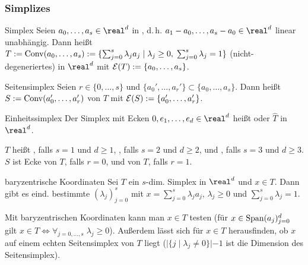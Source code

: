 \pagebreak

\subsubsection{%
    Simplizes%
}

\begin{Def}{Simplex}
    Seien $a_0, \dotsc, a_s \in \real^d$ in ,
    d.\,h. $a_1 - a_0, \dotsc, a_s - a_0 \in \real^d$ linear unabhängig.
    Dann heißt $T := \operatorname{Conv}(a_0, \dotsc, a_s)
    := \{\sum_{j=0}^s \lambda_j a_j \;|\; \lambda_j \ge 0,\; \sum_{j=0}^s \lambda_j = 1\}$
    (nicht-degeneriertes)  in $\real^d$ mit
     $\mathcal{E}(T) := \{a_0, \dotsc, a_s\}$.
\end{Def}

\begin{Def}{Seitensimplex}
    Seien $r \in \{0, \dotsc, s\}$ und $\{a_0', \dotsc, a_r'\} \subset \{a_0, \dotsc, a_s\}$.
    Dann heißt\\
    $S := \operatorname{Conv}(a_0', \dotsc, a_r')$ 
    von $T$ mit  $\mathcal{E}(S) := \{a_0', \dotsc, a_r'\}$.
\end{Def}

\begin{Def}{Einheitssimplex}
    Der Simplex mit Ecken $0, e_1, \dotsc, e_d \in \real^d$
    heißt  oder  $\widehat{T}$ in $\real^d$.
\end{Def}

\begin{Bem}
    $T$ heißt , falls $s = 1$ und $d \ge 1$,
    , falls $s = 2$ und $d \ge 2$, und
    , falls $s = 3$ und $d \ge 3$.
    $S$ ist Ecke von $T$, falls $r = 0$,
    und  von $T$, falls $r = 1$.
\end{Bem}

\linie

\begin{Lemma}{baryzentrische Koordinaten}
    Sei $T$ ein $s$-dim. Simplex in $\real^d$ und $x \in T$.
    Dann gibt es eind. bestimmte 
    $(\lambda_j)_{j=0}^s$ mit $x = \sum_{j=0}^s \lambda_j a_j$,
    $\lambda_j \ge 0$ und $\sum_{j=0}^s \lambda_j = 1$.
\end{Lemma}

\begin{Bem}
    Mit baryzentrischen Koordinaten kann man $x \in T$ testen
    (für $x \in \operatorname{Span}(a_j)_{j=0}^d$ gilt
    $x \in T \iff \forall_{j=0,\dotsc,s}\; \lambda_j \ge 0$).
    Außerdem lässt sich für $x \in T$ herausfinden, ob $x$ auf einem echten Seitensimplex
    von $T$ liegt
    ($|\{j \;|\; \lambda_j \not= 0\}| - 1$ ist die Dimension des Seitensimplex).
\end{Bem}

